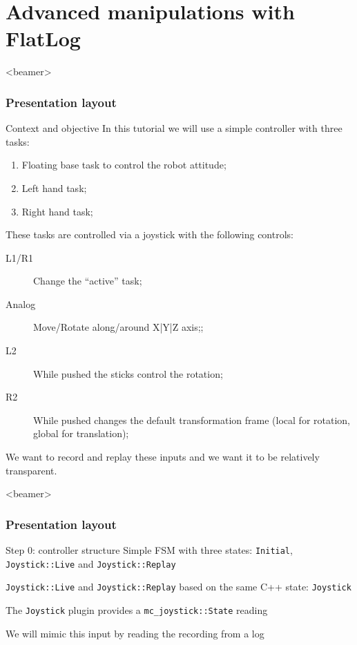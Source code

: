 \documentclass[c,aspectratio=169]{beamer}
\begin{document}
\section{Advanced manipulations with FlatLog}

\begin{frame}<beamer>
  \frametitle{Presentation layout}
  \setcounter{tocdepth}{1}
\end{frame}

\begin{frame}{Context and objective}
  In this tutorial we will use a simple controller with three tasks:
  \begin{enumerate}
    \item Floating base task to control the robot attitude;
    \item Left hand task;
    \item Right hand task;
  \end{enumerate}

  These tasks are controlled via a joystick with the following controls:
  \begin{description}
    \item[L1/R1] Change the ``active'' task;
    \item[Analog] Move/Rotate along/around X|Y|Z axis;;
    \item[L2] While pushed the sticks control the rotation;
    \item[R2] While pushed changes the default transformation frame (local for rotation, global for translation);
  \end{description}

  We want to record and replay these inputs and we want it to be relatively transparent.
\end{frame}

\begin{frame}<beamer>
  \frametitle{Presentation layout}
  \setcounter{tocdepth}{2}
\end{frame}

\begin{frame}[fragile]{Step 0: controller structure}
  Simple FSM with three states: \verb|Initial|, \verb|Joystick::Live| and \verb|Joystick::Replay|

  \medskip

  \verb|Joystick::Live| and \verb|Joystick::Replay| based on the same C++ state: \verb|Joystick|

  \vfill

  The \verb|Joystick| plugin provides a \verb|mc_joystick::State| reading

  \medskip

  We will mimic this input by reading the recording from a log


\end{frame}
\end{document}
